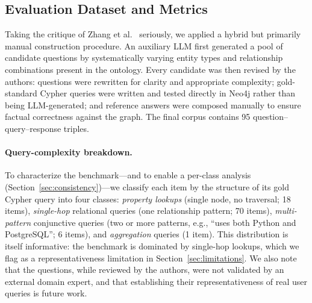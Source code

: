 \documentclass{ceurart}
\begin{document}
\subsection{Evaluation Dataset and Metrics}
\label{sec:dataset}

Taking the critique of Zhang et al.~\cite{zhang2025diagnosingaddressingpitfallskgrag}
seriously, we applied a hybrid but primarily manual construction procedure. An
auxiliary LLM first generated a pool of candidate questions by systematically
varying entity types and relationship combinations present in the ontology. Every
candidate was then revised by the authors: questions were rewritten for clarity
and appropriate complexity; gold-standard Cypher queries were written and tested
directly in Neo4j rather than being LLM-generated; and reference answers were
composed manually to ensure factual correctness against the graph. The final
corpus contains 95 question--query--response triples.

\paragraph{Query-complexity breakdown.}
To characterize the benchmark---and to enable a per-class analysis
(Section~\ref{sec:consistency})---we classify each item by the structure of its
gold Cypher query into four classes: \emph{property lookups} (single node, no
traversal; 18 items), \emph{single-hop} relational queries (one relationship
pattern; 70 items), \emph{multi-pattern} conjunctive queries (two or more
patterns, e.g., ``uses both Python and PostgreSQL''; 6 items), and
\emph{aggregation} queries (1 item). This distribution is itself informative: the
benchmark is dominated by single-hop lookups, which we flag as a representativeness
limitation in Section~\ref{sec:limitations}. We also note that the questions,
while reviewed by the authors, were not validated by an external domain expert, and
that establishing their representativeness of real user queries is future work.
\end{document}
